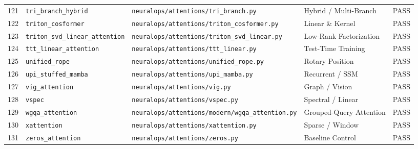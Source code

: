 \begin{center}
\begin{longtable}{rllll}
121 & \texttt{tri\_branch\_hybrid} & \texttt{neuralops/attentions/tri\_branch.py} & Hybrid / Multi-Branch & PASS \\
122 & \texttt{triton\_cosformer} & \texttt{neuralops/attentions/triton\_cosformer.py} & Linear \& Kernel & PASS \\
123 & \texttt{triton\_svd\_linear\_attention} & \texttt{neuralops/attentions/triton\_svd\_linear.py} & Low-Rank Factorization & PASS \\
124 & \texttt{ttt\_linear\_attention} & \texttt{neuralops/attentions/ttt\_linear.py} & Test-Time Training & PASS \\
125 & \texttt{unified\_rope} & \texttt{neuralops/attentions/unified\_rope.py} & Rotary Position & PASS \\
126 & \texttt{upi\_stuffed\_mamba} & \texttt{neuralops/attentions/upi\_mamba.py} & Recurrent / SSM & PASS \\
127 & \texttt{vig\_attention} & \texttt{neuralops/attentions/vig.py} & Graph / Vision & PASS \\
128 & \texttt{vspec} & \texttt{neuralops/attentions/vspec.py} & Spectral / Linear & PASS \\
129 & \texttt{wgqa\_attention} & \texttt{neuralops/attentions/modern/wgqa\_attention.py} & Grouped-Query Attention & PASS \\
130 & \texttt{xattention} & \texttt{neuralops/attentions/xattention.py} & Sparse / Window & PASS \\
131 & \texttt{zeros\_attention} & \texttt{neuralops/attentions/zeros.py} & Baseline Control & PASS \\
\bottomrule
\end{longtable}
\end{center}
